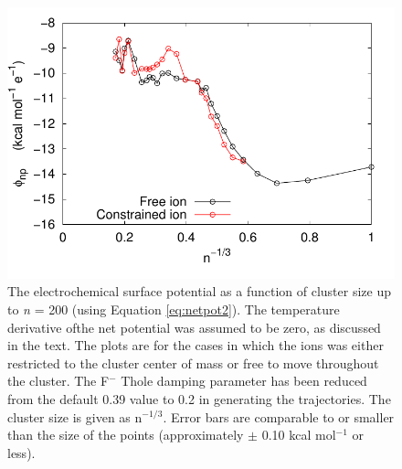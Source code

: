 \begin{cpa}
\begin{figure}
 \begin{center}
  \includegraphics[width=0.98\linewidth]{images/cpa/net_pot_no_temp_deriv-eps-converted-to.pdf}
 \end{center}
\caption[Net potential with no temperature derivative]{The electrochemical surface potential as a function of cluster size up to \emph{n} = 200 (using Equation \ref{eq:netpot2}).
The temperature derivative ofthe net potential was assumed to be zero, as discussed in the text. The plots are for the cases in which the ions was either restricted to the
cluster center of mass or free to move throughout the cluster. The F$^{-}$ Thole damping parameter has been reduced from the default 0.39 value to 0.2 in generating the trajectories. 
The cluster size is given as n$^{-1/3}$. Error bars are comparable to or smaller than the size of the points (approximately $\pm$ 0.10 kcal mol$^{-1}$ or less).}
\label{fig:netpotsim}
\end{figure}


\end{cpa}
